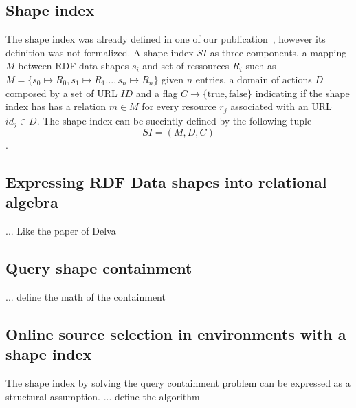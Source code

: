 \fi

\subsection{Shape index}
The shape index was already defined in one of our publication~\cite{tam2024opportunitiesshapebasedoptimizationlink}, however its definition was not formalized.
A shape index $SI$ as three components, a mapping $M$ between RDF data shapes $s_i$ and set of ressources $R_i$ such as $M = \{s_0 \mapsto R_0, s_1 \mapsto R_1..., s_n \mapsto R_n\}$ given $n$ entries,
a domain of actions $D$ composed by a set of URL $ID$ and
a flag $C\rightarrow \{\mathrm{true}, \mathrm{false}\}$ indicating if the shape index has has a relation $m \in M$ for every resource $r_j$ associated with an URL $id_j \in D$. 
The shape index can be succintly defined by the following tuple 
\begin{equation}
SI = (M, D, C)
\end{equation}.

\subsection{Expressing RDF Data shapes into relational algebra}
... 
Like the paper of Delva

\subsection{Query shape containment}
...
define the math of the containment


\subsection{Online source selection in environments with a shape index}

The shape index by solving the query containment problem can be expressed as a structural assumption.
... define the algorithm
